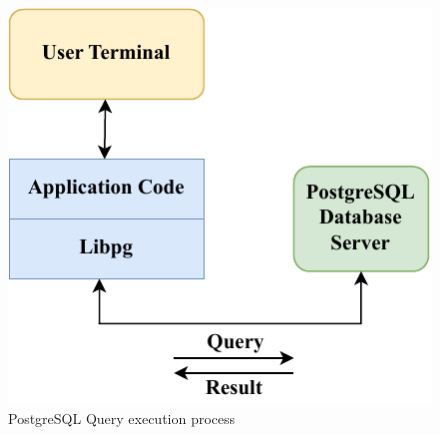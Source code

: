 \begin{figure}[hbt!]
\centering
\includegraphics[width=0.4\linewidth]{img/pg-query-execution.pdf}
\caption[PostgreSQL Query execution process]{PostgreSQL Query execution process~\cite{noauthor_bruce_nodate}}
\label{fig:pg-query-execution}
\end{figure}